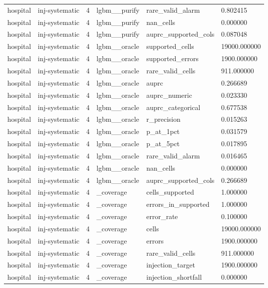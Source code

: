 \begin{tabular}{llllll}
hospital & inj-systematic & 4 & lgbm\_\_purify & rare\_valid\_alarm & 0.802415 \\
hospital & inj-systematic & 4 & lgbm\_\_purify & nan\_cells & 0.000000 \\
hospital & inj-systematic & 4 & lgbm\_\_purify & auprc\_supported\_cols & 0.087048 \\
hospital & inj-systematic & 4 & lgbm\_\_oracle & supported\_cells & 19000.000000 \\
hospital & inj-systematic & 4 & lgbm\_\_oracle & supported\_errors & 1900.000000 \\
hospital & inj-systematic & 4 & lgbm\_\_oracle & rare\_valid\_cells & 911.000000 \\
hospital & inj-systematic & 4 & lgbm\_\_oracle & auprc & 0.266689 \\
hospital & inj-systematic & 4 & lgbm\_\_oracle & auprc\_numeric & 0.023330 \\
hospital & inj-systematic & 4 & lgbm\_\_oracle & auprc\_categorical & 0.677538 \\
hospital & inj-systematic & 4 & lgbm\_\_oracle & r\_precision & 0.015263 \\
hospital & inj-systematic & 4 & lgbm\_\_oracle & p\_at\_1pct & 0.031579 \\
hospital & inj-systematic & 4 & lgbm\_\_oracle & p\_at\_5pct & 0.017895 \\
hospital & inj-systematic & 4 & lgbm\_\_oracle & rare\_valid\_alarm & 0.016465 \\
hospital & inj-systematic & 4 & lgbm\_\_oracle & nan\_cells & 0.000000 \\
hospital & inj-systematic & 4 & lgbm\_\_oracle & auprc\_supported\_cols & 0.266689 \\
hospital & inj-systematic & 4 & \_coverage & cells\_supported & 1.000000 \\
hospital & inj-systematic & 4 & \_coverage & errors\_in\_supported & 1.000000 \\
hospital & inj-systematic & 4 & \_coverage & error\_rate & 0.100000 \\
hospital & inj-systematic & 4 & \_coverage & cells & 19000.000000 \\
hospital & inj-systematic & 4 & \_coverage & errors & 1900.000000 \\
hospital & inj-systematic & 4 & \_coverage & rare\_valid\_cells & 911.000000 \\
hospital & inj-systematic & 4 & \_coverage & injection\_target & 1900.000000 \\
hospital & inj-systematic & 4 & \_coverage & injection\_shortfall & 0.000000 \\

\end{tabular}
